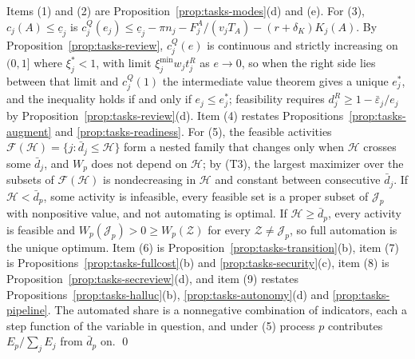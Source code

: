 Items (1) and (2) are Proposition~\ref{prop:tasks-modes}(d) and (e). For (3), $c_j(A)\le\underline c_j$ is $c^Q_j(e_j)\le\underline c_j-\pi n_j-F^A_j/(v_jT_A)-(r+\delta_K)K_j(A)$. By Proposition~\ref{prop:tasks-review}, $c^Q_j(e)$ is continuous and strictly increasing on $(0,1]$ where $\xi^*_j<1$, with limit $\xi^{\min}_jw_jt^R_j$ as $e\to 0$, so when the right side lies between that limit and $c^Q_j(1)$ the intermediate value theorem gives a unique $e^*_j$, and the inequality holds if and only if $e_j\le e^*_j$; feasibility requires $d^R_j\ge 1-\bar\varepsilon_j/e_j$ by Proposition~\ref{prop:tasks-review}(d). Item (4) restates Propositions~\ref{prop:tasks-augment} and \ref{prop:tasks-readiness}. For (5), the feasible activities $\mathcal F(\mathcal H)=\{j:\bar d_j\le\mathcal H\}$ form a nested family that changes only when $\mathcal H$ crosses some $\bar d_j$, and $W_p$ does not depend on $\mathcal H$; by (T3), the largest maximizer over the subsets of $\mathcal F(\mathcal H)$ is nondecreasing in $\mathcal H$ and constant between consecutive $\bar d_j$. If $\mathcal H<\bar d_p$, some activity is infeasible, every feasible set is a proper subset of $\mathcal J_p$ with nonpositive value, and not automating is optimal. If $\mathcal H\ge\bar d_p$, every activity is feasible and $W_p(\mathcal J_p)>0\ge W_p(\mathcal Z)$ for every $\mathcal Z\ne\mathcal J_p$, so full automation is the unique optimum. Item (6) is Proposition~\ref{prop:tasks-transition}(b), item (7) is Propositions~\ref{prop:tasks-fullcost}(b) and \ref{prop:tasks-security}(c), item (8) is Proposition~\ref{prop:tasks-secreview}(d), and item (9) restates Propositions~\ref{prop:tasks-halluc}(b), \ref{prop:tasks-autonomy}(d) and \ref{prop:tasks-pipeline}. The automated share is a nonnegative combination of indicators, each a step function of the variable in question, and under (5) process $p$ contributes $E_p/\sum_jE_j$ from $\bar d_p$ on. \qed
